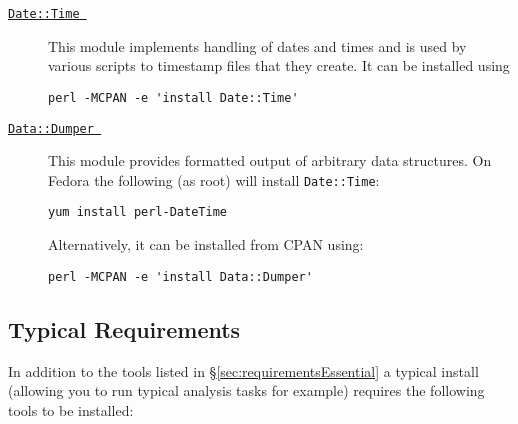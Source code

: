 \begin{description}
\item [\href{http://search.cpan.org/~drolsky/DateTime-0.70/lib/DateTime.pm}{{\tt Date::Time }}] This module implements handling of dates and times and is used by various scripts to timestamp files that they create. It can be installed using
\begin{verbatim}
perl -MCPAN -e 'install Date::Time'
\end{verbatim}

\item [\href{http://search.cpan.org/~smueller/Data-Dumper-2.131/Dumper.pm}{{\tt Data::Dumper }}] This module provides formatted output of arbitrary data structures. On Fedora the following (as root) will install {\tt Date::Time}:
\begin{verbatim}
yum install perl-DateTime
\end{verbatim}
Alternatively, it can be installed from CPAN using:
\begin{verbatim}
perl -MCPAN -e 'install Data::Dumper'
\end{verbatim}
\end{description}

\subsection{Typical Requirements}\label{sec:requirementsTypical}

In addition to the tools listed in \S\ref{sec:requirementsEssential} a typical install (allowing you to run typical analysis tasks for example) requires the following tools to be installed:


